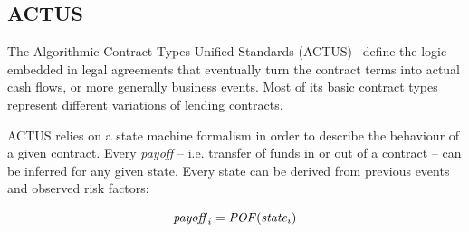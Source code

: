 \documentclass[runningheads]{llncs}
\newcommand{\ident}[1]{\mbox{\emph{#1}}}
\begin{document}
%
%
%

\subsection{ACTUS}
\label{ACTUS}

The Algorithmic Contract Types Unified Standards (ACTUS)~\cite{actus} define the logic embedded in legal agreements that eventually
turn the contract terms into actual cash flows, or more generally
business events. Most of its basic contract types represent
different variations of lending contracts.

ACTUS relies on a state machine formalism in order to describe the
behaviour of a given contract. Every \emph{payoff} -- i.e. transfer of funds in
or out of a contract -- can be inferred for any given state. Every state
can be derived from previous events and observed risk factors:

\noindent 
\begin{equation*}
\ident{payoff}_{i}=\ident{POF}(\ident{state}_{i})
\end{equation*}
\end{document}
